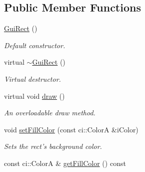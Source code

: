 \subsection*{Public Member Functions}
\begin{DoxyCompactItemize}
\item 
\hypertarget{class_gui_rect_a5bf3239a3fda5714e3b809fed8d2f18a}{\hyperlink{class_gui_rect_a5bf3239a3fda5714e3b809fed8d2f18a}{Gui\-Rect} ()}\label{class_gui_rect_a5bf3239a3fda5714e3b809fed8d2f18a}

\begin{DoxyCompactList}\small\item\em Default constructor. \end{DoxyCompactList}\item 
\hypertarget{class_gui_rect_a675b104d83a40f4451f39aca2da5963e}{virtual \hyperlink{class_gui_rect_a675b104d83a40f4451f39aca2da5963e}{$\sim$\-Gui\-Rect} ()}\label{class_gui_rect_a675b104d83a40f4451f39aca2da5963e}

\begin{DoxyCompactList}\small\item\em Virtual destructor. \end{DoxyCompactList}\item 
\hypertarget{class_gui_rect_abda31c93cd7ce05e2e90fa088e3cd7e2}{virtual void \hyperlink{class_gui_rect_abda31c93cd7ce05e2e90fa088e3cd7e2}{draw} ()}\label{class_gui_rect_abda31c93cd7ce05e2e90fa088e3cd7e2}

\begin{DoxyCompactList}\small\item\em An overloadable draw method. \end{DoxyCompactList}\item 
\hypertarget{class_gui_rect_aae1204fe60342bc98d23bb9313a84b4c}{void \hyperlink{class_gui_rect_aae1204fe60342bc98d23bb9313a84b4c}{set\-Fill\-Color} (const ci\-::\-Color\-A \&i\-Color)}\label{class_gui_rect_aae1204fe60342bc98d23bb9313a84b4c}

\begin{DoxyCompactList}\small\item\em Sets the rect's background color. \end{DoxyCompactList}\item 
\hypertarget{class_gui_rect_a6898af3268885b602a70b7fdb73bd317}{const ci\-::\-Color\-A \& \hyperlink{class_gui_rect_a6898af3268885b602a70b7fdb73bd317}{get\-Fill\-Color} () const }\label{class_gui_rect_a6898af3268885b602a70b7fdb73bd317}


\end{DoxyCompactItemize}
